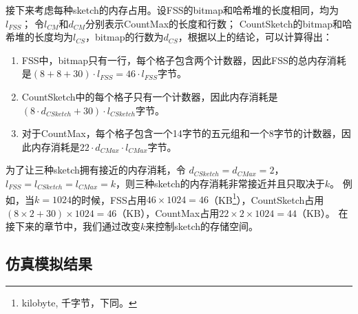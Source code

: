 接下来考虑每种sketch的内存占用。设FSS的bitmap和哈希堆的长度相同，均为$l_{FSS}$；
令$l_{CM}$和$d_{CM}$分别表示CountMax的长度和行数；
CountSketch的bitmap和哈希堆的长度均为$l_{CS}$，bitmap的行数为$d_{CS}$，根据以上的结论，可以计算得出：

\begin{enumerate}
\item 
FSS中，bitmap只有一行，每个格子包含两个计数器，因此FSS的总内存消耗是$(8+8+30)\cdot l_{FSS} = 46\cdot l_{FSS}$字节。
\item CountSketch中的每个格子只有一个计数器，因此内存消耗是$(8\cdot d_{CSketch} + 30)\cdot l_{CSketch}$字节。
\item 对于CountMax，每个格子包含一个14字节的五元组和一个8字节的计数器，因此内存消耗是$22 \cdot d_{CMax}\cdot l_{CMax}$字节。
\end{enumerate}

为了让三种sketch拥有接近的内存消耗，令 $d_{CSketch}=d_{CMax}=2$，$l_{FSS}=l_{CSketch}=l_{CMax}=k$，则三种sketch的内存消耗非常接近并且只取决于$k$。
例如，当$k=1024$的时候，FSS占用$46 \times 1024 = 46$（KB\footnote{kilobyte, 千字节，下同。}），CountSketch占用$(8\times 2 +30)\times 1024 = 46$（KB），CountMax占用$22\times 2\times 1024=44$（KB）。
在接下来的章节中，我们通过改变$k$来控制sketch的存储空间。

\subsection{仿真模拟结果}

